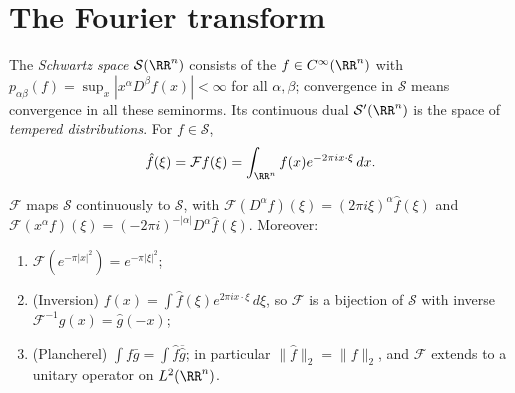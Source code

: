 \section{The Fourier transform}\label{distributions:section-fourier}

\begin{definition}\label{distributions:definition-schwartz}
The \emph{Schwartz space} $\mathcal{S}(\RR^n)$ consists of the $f \in C^\infty(\RR^n)$ with $p_{\alpha\beta}(f) = \sup_x|x^\alpha D^\beta f(x)| < \infty$ for all $\alpha, \beta$; convergence in $\mathcal{S}$ means
convergence in all these seminorms. Its continuous dual $\mathcal{S}'(\RR^n)$ is the space of \emph{tempered distributions}. For $f \in \mathcal{S}$,
\[
\hat f(\xi) = \mathcal{F}f(\xi) = \int_{\RR^n}f(x)e^{-2\pi i x \cdot \xi}\,dx .
\]
\end{definition}

\begin{theorem}\label{distributions:theorem-fourier-schwartz}
$\mathcal{F}$ maps $\mathcal{S}$ continuously to $\mathcal{S}$, with $\mathcal{F}(D^\alpha f)(\xi) = (2\pi i\xi)^\alpha\hat f(\xi)$ and $\mathcal{F}(x^\alpha f)(\xi) = (-2\pi i)^{-|\alpha|}D^\alpha\hat f(\xi)$.
Moreover:
\begin{enumerate}
\item $\mathcal{F}(e^{-\pi|x|^2}) = e^{-\pi|\xi|^2}$;
\item (Inversion) $f(x) = \int\hat f(\xi)e^{2\pi ix\cdot\xi}\,d\xi$, so $\mathcal{F}$ is a bijection of $\mathcal{S}$ with inverse $\mathcal{F}^{-1}g(x) = \hat g(-x)$;
\item (Plancherel) $\int f\bar g = \int\hat f\overline{\hat g}$; in particular $\|\hat f\|_2 = \|f\|_2$, and $\mathcal{F}$ extends to a unitary operator on $L^2(\RR^n)$.
\end{enumerate}
\end{theorem}

